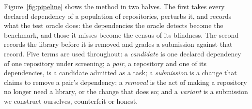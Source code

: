 \documentclass[11pt]{article}
\begin{document}
Figure~\ref{fig:pipeline} shows the method in two halves.
The first takes every declared dependency of a population of repositories, perturbs it, and records what the test oracle does: the dependencies the oracle detects become the benchmark, and those it misses become the census of its blindness.
The second records the library before it is removed and grades a submission against that record.
Five terms are used throughout: a \emph{candidate} is one declared dependency of one repository under screening; a \emph{pair}, a repository and one of its dependencies, is a candidate admitted as a task; a \emph{submission} is a change that claims to remove a pair's dependency; a \emph{removal} is the act of making a repository no longer need a library, or the change that does so; and a \emph{variant} is a submission we construct ourselves, counterfeit or honest.
\end{document}
